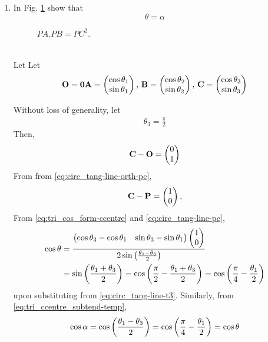 \begin{enumerate}[label=\thesection.\arabic*.,ref=\thesection.\theenumi]
\item
In Fig. \ref{fig:circ_tang_icept} show that 
%
\begin{equation}
\theta = \alpha
\end{equation}
%
\label{them:tang_icept_ang}
	\begin{figure}[!ht]
		\begin{center}
			
			\resizebox{\columnwidth}{!}{}
		\end{center}
		\caption{$PA.PB = PC^2$.}
		\label{fig:circ_tang_icept}	
	\end{figure}
	\\
	\solution
	Let 
    Let
  \begin{align}
	  \mathbf{O} = \mathbf{0}
	  \mathbf{A} = \begin{pmatrix}\cos \theta_1 \\ \sin \theta_1\end{pmatrix},\,
	  \mathbf{B} =  \begin{pmatrix}\cos \theta_2 \\ \sin \theta_2\end{pmatrix},\,
	  \mathbf{C} =  \begin{pmatrix}\cos \theta_3 \\ \sin \theta_3\end{pmatrix}
  \end{align}
  \iffalse
  From 
\eqref{eq:tri_ccentre_subtend-temp}
  \begin{align}
	  \cos \alpha = \cos\brak{ \frac{\theta_1-\theta_3}{2}  }
		\label{eq:circ_tang-line-alpha}	
  \end{align}
  \fi
  Without loss of generality,  let 
  \begin{align}
	  \theta_3 = \frac{\pi}{2}
		\label{eq:circ_tang-line-t3}	
  \end{align}
  Then, 
  \begin{align}
	  \mathbf{C}-\mathbf{O} = \begin{pmatrix}0 \\ 1\end{pmatrix}
  \end{align}
  From 
		from \eqref{eq:circ_tang-line-orth-pc},	
  \begin{align}
	  \vec{C}-\vec{P} = \myvec{1 \\ 0}
		\label{eq:circ_tang-line-pc},	
  \end{align}
From   
\eqref{eq:tri_cos_form-ccentre}
and 
		\eqref{eq:circ_tang-line-pc},	
  \begin{align}
	  \cos \theta &= \frac{
		  \begin{pmatrix}\cos \theta_3-\cos \theta_1 & \sin \theta_3-\sin \theta_1\end{pmatrix}
		  \begin{pmatrix}1 \\ 0\end{pmatrix}
		  }
		  {
	   2 \sin \left(\frac{\theta_1-\theta_3}{2}\right)
			  } 
			  \\
			  &=
	    \sin \left(\frac{\theta_1+\theta_3}{2}\right)
	    =\cos\left(\frac{\pi}{2}-\frac{\theta_1+\theta_3}{2}\right)
	    =\cos\left(\frac{\pi}{4}-\frac{\theta_1}{2}\right)
  \end{align}
  upon substituting from 
		\eqref{eq:circ_tang-line-t3}.  Similarly, 	
		from
\eqref{eq:tri_ccentre_subtend-temp},
  \begin{align}
	  \cos \alpha = \cos \left(\frac{\theta_1-\theta_3}{2}  \right)
	    =\cos\left(\frac{\pi}{4}-\frac{\theta_1}{2}\right)
	  =\cos \theta
  \end{align}
	\iffalse


\end{enumerate}

